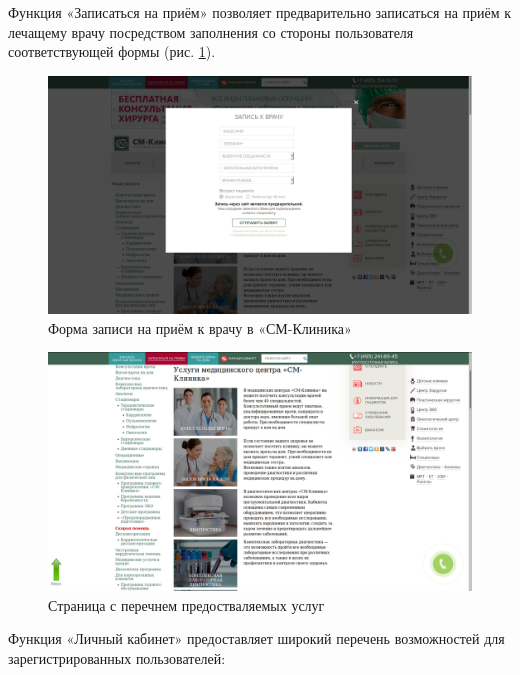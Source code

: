 \documentclass[14pt,a4paper,russian]{extreport}
\begin{document}
Функция «Записаться на приём» позволяет предварительно записаться на приём к лечащему врачу посредством заполнения
со стороны пользователя соответствующей формы (рис. \ref{fig:appdoc}).

\begin{figure}[t!]
        \includegraphics[width=\textwidth]{appdoc}
        \caption{Форма записи на приём к врачу в «СМ-Клиника»}
        \label{fig:appdoc}
\end{figure}
\cleardoublepage
\begin{figure}[t!]
        \includegraphics[width=\textwidth]{lkcm}
        \caption{Страница с перечнем предостваляемых услуг}
        \label{fig:lkcm}
\end{figure}

Функция «Личный кабинет» предоставляет широкий перечень возможностей для зарегистрированных
пользователей:
\end{document}
